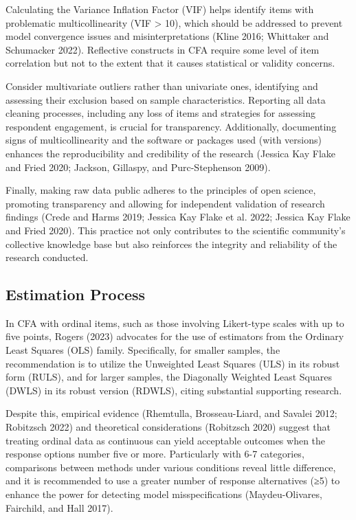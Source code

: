 \documentclass[
  a4paper,
]{article}
\begin{document}
Calculating the Variance Inflation Factor (VIF) helps identify items
with problematic multicollinearity (VIF \textgreater{} 10), which should
be addressed to prevent model convergence issues and misinterpretations
(Kline 2016; Whittaker and Schumacker 2022). Reflective constructs in
CFA require some level of item correlation but not to the extent that it
causes statistical or validity concerns.

Consider multivariate outliers rather than univariate ones, identifying
and assessing their exclusion based on sample characteristics. Reporting
all data cleaning processes, including any loss of items and strategies
for assessing respondent engagement, is crucial for transparency.
Additionally, documenting signs of multicollinearity and the software or
packages used (with versions) enhances the reproducibility and
credibility of the research (Jessica Kay Flake and Fried 2020; Jackson,
Gillaspy, and Purc-Stephenson 2009).

Finally, making raw data public adheres to the principles of open
science, promoting transparency and allowing for independent validation
of research findings (Crede and Harms 2019; Jessica Kay Flake et al.
2022; Jessica Kay Flake and Fried 2020). This practice not only
contributes to the scientific community's collective knowledge base but
also reinforces the integrity and reliability of the research conducted.

\subsection{Estimation Process}\label{estimation-process}

In CFA with ordinal items, such as those involving Likert-type scales
with up to five points, Rogers (2023) advocates for the use of
estimators from the Ordinary Least Squares (OLS) family. Specifically,
for smaller samples, the recommendation is to utilize the Unweighted
Least Squares (ULS) in its robust form (RULS), and for larger samples,
the Diagonally Weighted Least Squares (DWLS) in its robust version
(RDWLS), citing substantial supporting research.

Despite this, empirical evidence (Rhemtulla, Brosseau-Liard, and Savalei
2012; Robitzsch 2022) and theoretical considerations (Robitzsch 2020)
suggest that treating ordinal data as continuous can yield acceptable
outcomes when the response options number five or more. Particularly
with 6-7 categories, comparisons between methods under various
conditions reveal little difference, and it is recommended to use a
greater number of response alternatives (≥5) to enhance the power for
detecting model misspecifications (Maydeu-Olivares, Fairchild, and Hall
2017).
\end{document}
